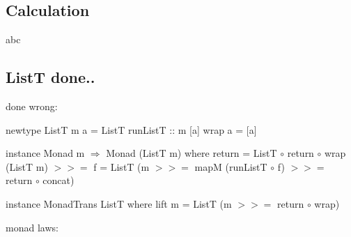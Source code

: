 \documentclass{article}
\newcommand{\hbind}{>\!\!\!>\!\!\!=}
\begin{document}
\subsection*{Calculation}
\begin{code}
abc
\end{code}
\subsection*{{\ttfamily ListT} done..}
done wrong:
\begin{code}
newtype ListT m a = ListT { runListT :: m [a] }
wrap a = [a]

instance Monad m $\Rightarrow$ Monad (ListT m) where
    return = ListT $\circ$ return $\circ$ wrap
    (ListT m) $\hbind$ f = ListT (m $\hbind$ mapM (runListT $\circ$ f) $\hbind$ return $\circ$ concat)

instance MonadTrans ListT where
    lift m = ListT (m $\hbind$ return $\circ$ wrap)
\end{code}
monad laws:
\end{document}
